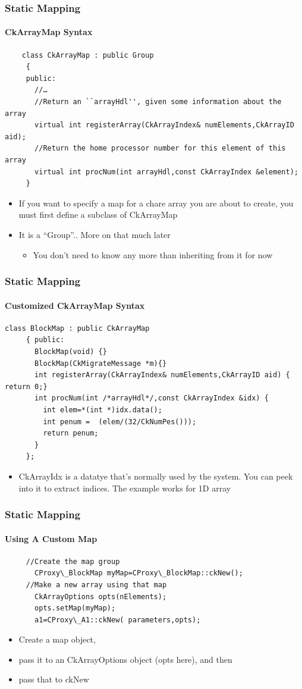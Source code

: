 \begin{frame}[fragile]
  \frametitle{Static Mapping}
  \framesubtitle{CkArrayMap Syntax}
  \begin{lstlisting}
    class CkArrayMap : public Group
     {
     public:
       //…
       //Return an ``arrayHdl'', given some information about the array
       virtual int registerArray(CkArrayIndex& numElements,CkArrayID aid);
       //Return the home processor number for this element of this array
       virtual int procNum(int arrayHdl,const CkArrayIndex &element);
     }
  \end{lstlisting}
  \begin{itemize}
    \item If you want to specify a map for a chare array you are about to create, you must first define a subclass of CkArrayMap
    \item It is a “Group”.. More on that much later
    \begin{itemize}
      \item You don’t need to know any more than inheriting from it for now
    \end{itemize}
  \end{itemize}
\end{frame}

\begin{frame}[fragile]
  \frametitle{Static Mapping}
  \framesubtitle{Customized CkArrayMap Syntax}
  \begin{lstlisting}
class BlockMap : public CkArrayMap
     { public:
       BlockMap(void) {}
       BlockMap(CkMigrateMessage *m){}
       int registerArray(CkArrayIndex& numElements,CkArrayID aid) { return 0;}
       int procNum(int /*arrayHdl*/,const CkArrayIndex &idx) {
         int elem=*(int *)idx.data();
         int penum =  (elem/(32/CkNumPes()));
         return penum;
       }
     };
    \end{lstlisting}
  \begin{itemize}
    \item CkArrayIdx is a datatye that’s normally used by the system. You can peek into it to extract indices. The example works for 1D array
  \end{itemize}
\end{frame}

\begin{frame}[fragile]
  \frametitle{Static Mapping}
  \framesubtitle{Using A Custom Map}
  \begin{lstlisting}
     //Create the map group
       CProxy\_BlockMap myMap=CProxy\_BlockMap::ckNew();
     //Make a new array using that map
       CkArrayOptions opts(nElements);
       opts.setMap(myMap);
       a1=CProxy\_A1::ckNew( parameters,opts);
  \end{lstlisting}
  \begin{itemize}
    \item Create a map object, 
    \item pass it to an CkArrayOptions object (opts here), and then 
    \item pass that to ckNew
  \end{itemize}
\end{frame}

